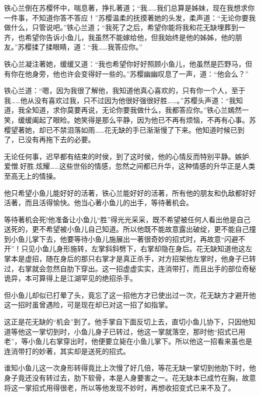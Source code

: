 \documentclass[12pt,oneside]{book}
\begin{document}
铁心兰倒在苏樱怀中，喘息著，挣扎著道；``我\ldots\ldots 我们总算是姊妹，现在我想求你一件事，不知道你答不答应！''苏樱温柔的抚摸著她的头发，柔声道：``无论你要我做什么，只管说吧。''铁心兰道；``我死了之后，希望你能将我和花无缺埋葬到一齐，也希望你告诉小鱼儿，我虽然不能嫁给他，但我始终是他的姊姊，他的朋友。''苏樱揉了揉眼睛，道：``我\ldots\ldots 我答应你。''

铁心兰凝注著她，缓缓又道：``我也希望你好好照顾小鱼儿，他虽然是匹野马，但有你在他身旁，他也许会变得好一些的。''苏樱幽幽叹息了一声，道：``他会么？''

铁心兰道：``嗯，因为我很了解他，我知道他真心喜欢的，只有你一个人，至于我\ldots\ldots 他从没有喜欢过我，只不过因为他很好强很好胜\ldots\ldots。''苏樱头声道：``我知道，我全知道，求你莫要再说，无论你要我做什么，我都答应你。''铁心兰嫣然一笑，缓缓阖起了眼睑。她笑得是那么平静，因为他已不再有烦恼，不再有心事。苏樱望著她，却已不禁泪落如雨\ldots\ldots 花无缺的手已渐渐慢了下来。他知道时候已到了，已没有再拖下去的必要。

无论任何事，迟早都有结束的时侯，到了这时侯，他的心情反而特别平静。嫉妒.爱憎.好胜.炫耀\ldots\ldots 这些世俗的情感，忽然之间都已升华，这种情感的升华正是人类至高无上的情操。

他只希望小鱼儿能好好的活著，铁心兰能好好的活著，所有他的朋友和仇敌都好好活著，而且活得愉快。他当心著小鱼儿的出手，等待著机会。

等待著机会死!他准备让小鱼儿``胜''得光光采采，既不希望被任何人看出他是自己送死的，更不希望被小鱼儿自己知道。所以他既不能故意露出破绽，更不能自己撞到小鱼儿掌下去，他要等待小鱼儿施展出一著很奇妙的招式时，再故意``闪避不开''！只见小鱼儿身形施转，左掌斜斜劈下，右掌却隐在身后。花无缺知道他这左掌本是虚招，随在身后的那只右掌才是真正杀手，对方招架他左掌时，他身子已转过，右掌就会忽然自肋下穿出。这一招虚虚实实，连消带打，而且出手的部位奇秘诡异，本可算得上是江湖罕见的绝招杀手。

但小鱼儿却似已打晕了头，竟忘了这一招他方才已使出过一次，花无缺方才避开他这一招时虽曾遇险，可是现在却已对这一招了如指掌。

这正是花无缺的``机会''到了。他手掌自下面反切上去，直切小鱼儿协下，只因他知道等他这一掌切到时，小鱼儿身子已转过，他这一掌就落空，那时他``招式已用老''，等小鱼儿右掌穿出时，他便要立毙在小鱼儿掌下。所以他这一招看来虽也是连消带打的妙著，其实却是送死的招式。

谁知小鱼儿这一次身形转得竟比上次慢了好几倍，等花无缺一掌切到他肋下时，他身子竟还没有转过去，肋下软骨，本是人身要害之一。花无缺本已成竹在胸，故意将这一掌招式用得很老，所以等他发现不妙时，再想收招变式已来不及了。
\end{document}
